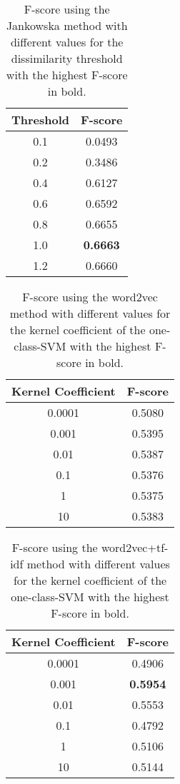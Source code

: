 \documentclass[11pt]{article}
\begin{document}
\begin{table}
\begin{center}
\small
\setlength{\tabcolsep}{2pt}
\begin{tabular}{c|c}
Threshold & F-score\\ 
\hline
0.1 & 0.0493\\
0.2 & 0.3486\\
0.4 & 0.6127\\
0.6 & 0.6592\\
0.8 & 0.6655\\
1.0 & \textbf{0.6663}\\
1.2 & 0.6660\\

\end{tabular}
\caption{F-score using the Jankowska method with different values for the dissimilarity threshold with the highest F-score in bold. \label{magtuning}}
\end{center}
\end{table}

\begin{table}
\begin{center}
\small
\setlength{\tabcolsep}{2pt}
\begin{tabular}{c|c}
Kernel Coefficient & F-score\\ 
\hline
0.0001 & 0.5080\\
0.001 & 0.5395\\
0.01 & 0.5387\\
0.1 & 0.5376\\
1 & 0.5375\\
10 & 0.5383\\


\end{tabular}
\caption{F-score using the word2vec method with different values for the kernel coefficient of the one-class-SVM with the highest F-score in bold. \label{SVMtuning}}
\end{center}
\end{table}

\begin{table}
\begin{center}
\small
\setlength{\tabcolsep}{2pt}
\begin{tabular}{c|c}
Kernel Coefficient & F-score\\ 
\hline
0.0001 & 0.4906\\
0.001 & \textbf{0.5954}\\
0.01 & 0.5553\\
0.1 & 0.4792\\
1 & 0.5106\\
10 & 0.5144\\


\end{tabular}
\caption{F-score using the word2vec+tf-idf method with different values for the kernel coefficient of the one-class-SVM with the highest F-score in bold. \label{tfidftuning}}
\end{center}
\end{table}
\end{document}
